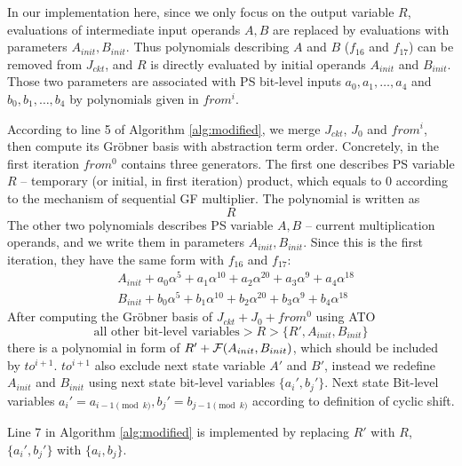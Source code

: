 \begin{Example}
In our implementation here, since we only focus on the output variable $R$, evaluations of intermediate input 
operands $A, B$ are replaced by evaluations with parameters $A_{init},B_{init}$. 
Thus polynomials describing $A$ and $B$ ($f_{16}$ and $f_{17}$) can be removed from $J_{ckt}$, and $R$ is directly
evaluated by initial operands $A_{init}$ and $B_{init}$. Those two parameters are associated with PS bit-level inputs
$a_0,a_1,\dots,a_4$ and $b_0,b_1,\dots,b_4$ by polynomials given in $from^i$.

According to line 5 of Algorithm \ref{alg:modified}, we merge $J_{ckt}$, $J_0$ and $from^i$, then compute its
Gr\"obner basis with abstraction term order. 
Concretely, in the first iteration $from^0$ contains three generators. The first one describes PS variable $R$ --
temporary (or initial, in first iteration) product, which equals to 0 according to the mechanism of sequential 
GF multiplier. The polynomial is written as 
$$R$$
The other two polynomials describes PS variable $A,B$ -- current multiplication operands, and we write them 
in parameters $A_{init}, B_{init}$. Since this is the first iteration, they have the same form with $f_{16}$ and $f_{17}$:
\begin{align*}
& A_{init}+a_0\alpha^5+a_1\alpha^{10}+a_2\alpha^{20}+a_3\alpha^9+a_4\alpha^{18} \\
& B_{init}+b_0\alpha^5+b_1\alpha^{10}+b_2\alpha^{20}+b_3\alpha^9+b_4\alpha^{18}
\end{align*}
After computing the Gr\"obner basis of $J_{ckt}+J_0+from^0$ using ATO 
$$\text{all other bit-level variables} > R > \{R',A_{init},B_{init}\}$$
there is a polynomial in form of $R'+{\mathcal{F}}(A_{init},B_{init})$,
which should be included by $to^{i+1}$. $to^{i+1}$ also exclude next state variable $A'$ and $B'$, instead we 
redefine $A_{init}$ and $B_{init}$ using next state bit-level variables $\{a_i', b_j'\}$. Next state Bit-level variables
$a_i' = a_{i-1\pmod k}, b_j' = b_{j-1\pmod k}$ according to definition of cyclic shift.

Line 7 in Algorithm \ref{alg:modified} is implemented by replacing $R'$ with $R$, $\{a_i', b_j'\}$ with $\{a_i,b_j\}$.


\end{Example}
